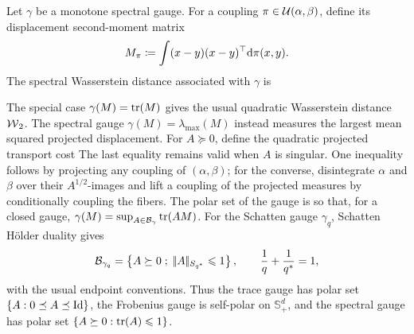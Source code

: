 \begin{defn}\label{def-spectral-wasserstein}
	Let $\gamma$ be a monotone spectral gauge. For a coupling $\pi\in\mathcal{U}(\alpha,\beta)$, define its displacement second-moment matrix
	\[
		M_\pi\coloneqq\int (x-y)(x-y)^\top\mathrm{d}\pi(x,y).
	\]
	The spectral Wasserstein distance associated with $\gamma$ is
\end{defn}

The special case $\gamma(M)=\operatorname{tr}(M)$ gives the usual quadratic Wasserstein distance $\operatorname{\mathcal{W}}_2$. The spectral gauge $\gamma(M)=\lambda_{\max}(M)$ instead measures the largest mean squared projected displacement. For $A\succeq0$, define the quadratic projected transport cost
The last equality remains valid when $A$ is singular. One inequality follows by projecting any coupling of $(\alpha,\beta)$; for the converse, disintegrate $\alpha$ and $\beta$ over their $A^{1/2}$-images and lift a coupling of the projected measures by conditionally coupling the fibers.
The polar set of the gauge is
so that, for a closed gauge, $\gamma(M)=\sup_{A\in\mathcal B_\gamma}\operatorname{tr}(AM)$. For the Schatten gauge $\gamma_q$, Schatten H\"older duality gives
\[
	\mathcal B_{\gamma_q}
	=
	\left\{ A\succeq0 \;;\; |\!| A |\!|_{S_{q^\ast}}\leqslant1 \right\},
	\qquad
	\frac1q+\frac1{q^\ast}=1,
\]
with the usual endpoint conventions. Thus the trace gauge has polar set $\{A:0\preceq A\preceq\mathrm{Id}\}$, the Frobenius gauge is self-polar on $\mathbb S_+^d$, and the spectral gauge has polar set $\{A\succeq0:\operatorname{tr}(A)\leqslant1\}$.

